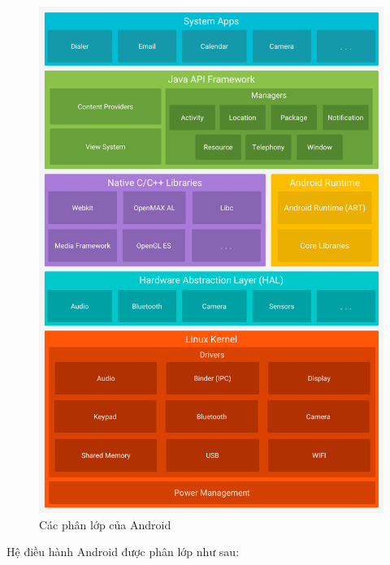 \documentclass[../../thesis]{subfiles}
\begin{document}
\begin{figure}
    \centering
    \includegraphics[width=\linewidth]{../images/android-stack_2x.png}
    \vspace*{-10mm}
    \caption{Các phân lớp của Android \cite{GOOGL_ANDR_ARCH}}
    \label{fig:android-stack}
\end{figure}

Hệ điều hành Android được phân lớp như sau:
\end{document}
